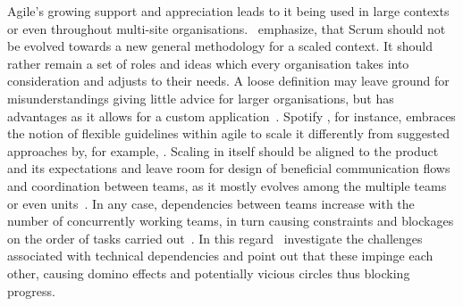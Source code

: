 Agile's growing support and appreciation leads to it being used in large contexts or even throughout multi-site organisations.~\citet{larman2008scalingleanagile} emphasize, that Scrum should not be evolved towards a new general methodology for a scaled context. It should rather remain a set of roles and ideas which every organisation takes into consideration and adjusts to their needs. A loose definition may leave ground for misunderstandings giving little advice for larger organisations, but has advantages as it allows for a custom application~\citep{laanti2013definitionsofagile}. 
Spotify \citep{kniberg2012agilespotify}, for instance, embraces the notion of flexible guidelines within agile to scale it differently from suggested approaches by, for example, \citet{larman2008scalingleanagile}. Scaling in itself should be aligned to the product and its expectations and leave room for design of beneficial communication flows and coordination between teams, as it mostly evolves among the multiple teams or even units~\citep{larman2008scalingleanagile}. In any case, dependencies between teams increase with the number of concurrently working teams, in turn causing constraints and blockages on the order of tasks carried out~\citep{moore2008scalingagile}.
In this regard~\citet{nelson2013technicaldependencies} investigate the challenges associated with technical dependencies and point out that these impinge each other, causing domino effects and potentially vicious circles thus blocking progress.

